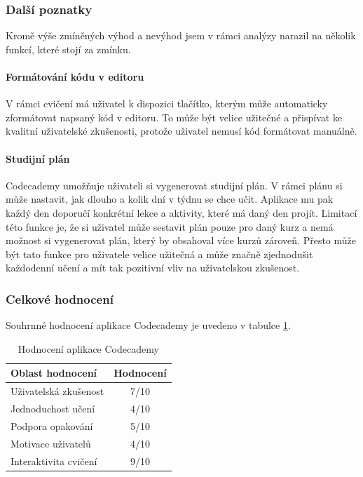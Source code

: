 \subsubsection{Další poznatky}

Kromě výše zmíněných výhod a nevýhod jsem v rámci analýzy narazil na několik funkcí, které stojí za zmínku.

\paragraph{Formátování kódu v editoru} V rámci cvičení má uživatel k dispozici tlačítko, kterým může automaticky zformátovat napsaný kód v editoru. To může být velice užitečné a přispívat ke kvalitní uživatelské zkušenosti, protože uživatel nemusí kód formátovat manuálně.

\paragraph{Studijní plán} Codecademy umožňuje uživateli si vygenerovat studijní plán. V rámci plánu si může nastavit, jak dlouho a kolik dní v týdnu se chce učit. Aplikace mu pak každý den doporučí konkrétní lekce a aktivity, které má daný den projít. Limitací této funkce je, že si uživatel může sestavit plán pouze pro daný kurz a nemá možnost si vygenerovat plán, který by obsahoval více kurzů zároveň. Přesto může být tato funkce pro uživatele velice užitečná a může značně zjednodušit každodenní učení a mít tak pozitivní vliv na uživatelskou zkušenost.

\subsubsection{Celkové hodnocení}

Souhrnné hodnocení aplikace Codecademy je uvedeno v tabulce \ref{table:competitor-rating-codecademy}.

\begin{table}[ht]
    \centering
    \begin{tabular}{@{} l c @{}}
        \toprule
        Oblast hodnocení & Hodnocení \\
        \midrule
        Uživatelská zkušenost & 7/10 \\
        Jednoduchost učení & 4/10 \\
        Podpora opakování & 5/10 \\
        Motivace uživatelů & 4/10 \\
        Interaktivita cvičení & 9/10 \\
        \bottomrule
    \end{tabular}
    \captionsetup{justification=centering}
    \caption{Hodnocení aplikace Codecademy}
    \label{table:competitor-rating-codecademy}
\end{table}
